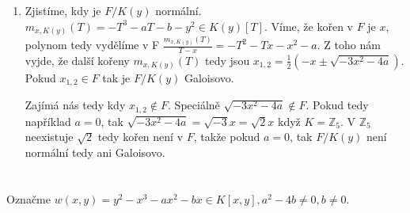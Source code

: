 \documentclass[12pt, a4paper]{article}
\begin{document}
\begin{enumerate}[label=(\alph*)]
    \item Zjistíme, kdy je $F/K(y)$ normální. $m_{x,K(y)}(T) = -T^3-aT-b-y^2 \in K(y)[T]$. Víme, že kořen v $F$ je $x$, polynom tedy vydělíme v F $\frac{m_{x,K(y)}(T)}{T-x} = -T^2-Tx-x^2-a$. Z toho nám vyjde, že další kořeny $m_{x,K(y)}(T)$ tedy jsou $x_{1,2} = \frac{1}{2}(-x\pm \sqrt{-3x^2-4a})$. Pokud $x_{1,2} \in F$ tak je $F/K(y)$ Galoisovo. 

    Zajímá nás tedy kdy $x_{1,2} \notin F$. Speciálně $\sqrt{-3x^2-4a} \notin F$. Pokud tedy například $a = 0$, tak $\sqrt{-3x^2-4a}=\sqrt{-3}x = \sqrt{2}x$ když $K = \mathbb{Z}_5$. V $\mathbb{Z}_5$ neexistuje $\sqrt{2}$ tedy kořen není v $F$, takže pokud $a=0$, tak $F/K(y)$ není normální tedy ani Galoisovo.
\end{enumerate}

\section{}
Označme $w(x,y)=y^2-x^3-ax^2-bx \in K[x,y], a^2-4b \neq 0, b \neq 0$.
\end{document}
